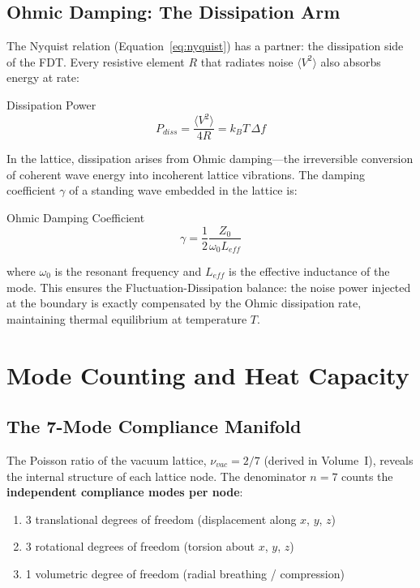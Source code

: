 \subsection{Ohmic Damping: The Dissipation Arm}

The Nyquist relation (Equation~\ref{eq:nyquist}) has a partner: the dissipation side of the FDT. Every resistive element $R$ that radiates noise $\langle V^2 \rangle$ also absorbs energy at rate:
\begin{resultbox}{Dissipation Power}
\begin{equation}
    P_{diss} = \frac{\langle V^2 \rangle}{4R} = k_B T \, \Delta f
    \label{eq:dissipation}
\end{equation}
\end{resultbox}

In the lattice, dissipation arises from Ohmic damping---the irreversible conversion of coherent wave energy into incoherent lattice vibrations. The damping coefficient $\gamma$ of a standing wave embedded in the lattice is:
\begin{resultbox}{Ohmic Damping Coefficient}
\begin{equation}
    \gamma = \frac{1}{2} \frac{Z_0}{\omega_0 L_{eff}}
    \label{eq:damping_coefficient}
\end{equation}
\end{resultbox}
where $\omega_0$ is the resonant frequency and $L_{eff}$ is the effective inductance of the mode. This ensures the Fluctuation-Dissipation balance: the noise power injected at the boundary is exactly compensated by the Ohmic dissipation rate, maintaining thermal equilibrium at temperature $T$.

\section{Mode Counting and Heat Capacity}
\label{sec:mode_counting}

\subsection{The 7-Mode Compliance Manifold}

The Poisson ratio of the vacuum lattice, $\nu_{vac} = 2/7$ (derived in Volume~I), reveals the internal structure of each lattice node. The denominator $n = 7$ counts the \textbf{independent compliance modes per node}:
\begin{enumerate}
    \item 3 translational degrees of freedom (displacement along $x$, $y$, $z$)
    \item 3 rotational degrees of freedom (torsion about $x$, $y$, $z$)
    \item 1 volumetric degree of freedom (radial breathing / compression)
\end{enumerate}

